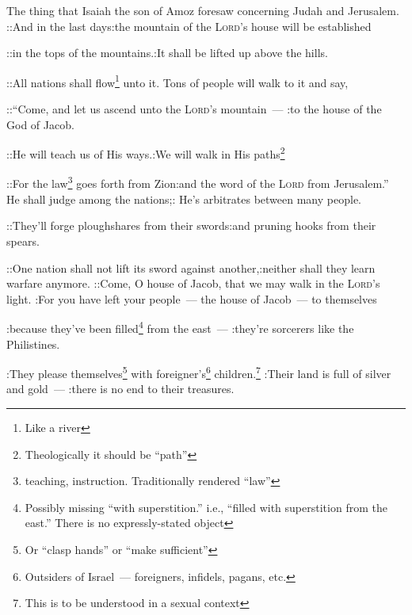 

\begin{enumerate*}[mode=unboxed]
     The thing that Isaiah the son of Amoz foresaw concerning Judah and Jerusalem.%
     ::And in the last days:the mountain of the \textsc{Lord}'s house will be established%
    
    ::in the tops of the mountains.:It shall be lifted up above the hills.%
    
    ::All nations shall flow\footnote{Like a river} unto it. Tons of people will walk to it and say,%
    
    ::``Come, and let us ascend unto the \textsc{Lord}'s mountain~--- :to the house of the God of Jacob.%
    
    ::He will teach us of His ways.:We will walk in His paths\footnote{Theologically it should be ``path''}%
    
    ::For the law\footnote{teaching, instruction. Traditionally rendered ``law''} goes forth from Zion:and the word of the \textsc{Lord} from Jerusalem.''%
     He shall judge among the nations;: He's arbitrates between many people.%
    
    ::They'll forge ploughshares from their swords:and pruning hooks from their spears.%
    
    ::One nation shall not lift its sword against another,:neither shall they learn warfare anymore.%
     ::Come, O house of Jacob, that we may walk in the \textsc{Lord}'s light.%
     :For you have left your people~--- the house of Jacob~--- to themselves%
    
    :because they've been filled\footnote{Possibly missing ``with superstition.'' i.e., ``filled with superstition from the east.'' There is no expressly-stated object} from the east~--- :they're sorcerers like the Philistines.%
    
    :They please themselves\footnote{Or ``clasp hands'' or ``make sufficient''} with foreigner's\footnote{Outsiders of Israel~--- foreigners, infidels, pagans, etc.} children.\footnote{This is to be understood in a sexual context}%
     :Their land is full of silver and gold~--- :there is no end to their treasures.%
    

\end{enumerate*}
